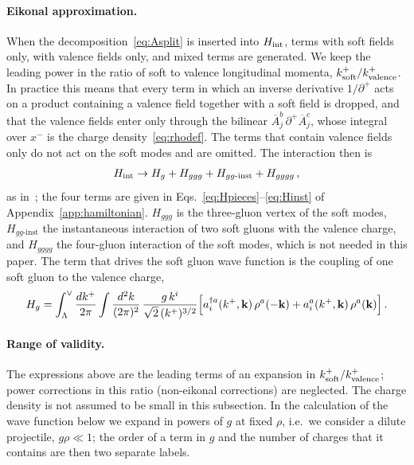 \paragraph{Eikonal approximation.} When the decomposition~\eqref{eq:Asplit} is inserted into $H_{\rm int}$, terms with soft fields only, with valence fields only, and mixed terms are generated. We keep the leading power in the ratio of soft to valence longitudinal momenta, $k^+_{\rm soft}/k^+_{\rm valence}$. In practice this means that every term in which an inverse derivative $1/\partial^+$ acts on a product containing a valence field together with a soft field is dropped, and that the valence fields enter only through the bilinear $\overline A^b_j\,\partial^+\overline A^c_j$, whose integral over $x^-$ is the charge density~\eqref{eq:rhodef}. The terms that contain valence fields only do not act on the soft modes and are omitted. The interaction then is
\begin{align}\label{eq:Hdecomp}
H_{\rm int}\to H_g+H_{ggg}+H_{gg\text{-inst}}+H_{gggg}\,,
\end{align}
as in~\cite{Lublinsky:2016meo}; the four terms are given in Eqs.~\eqref{eq:Hpieces}--\eqref{eq:Hinst} of Appendix~\ref{app:hamiltonian}. $H_{ggg}$ is the three-gluon vertex of the soft modes, $H_{gg\text{-inst}}$ the instantaneous interaction of two soft gluons with the valence charge, and $H_{gggg}$ the four-gluon interaction of the soft modes, which is not needed in this paper. The term that drives the soft gluon wave function is the coupling of one soft gluon to the valence charge,
\begin{align}\label{eq:Hg}
H_g=\int_\Lambda^\vee\frac{dk^+}{2\pi}\int\frac{d^2k}{(2\pi)^2}\,\frac{g\,k^i}{\sqrt2\,(k^+)^{3/2}}\Big[a^{\dagger a}_i(k^+,\mathbf{k})\,\rho^a(-\mathbf{k})+a^a_i(k^+,\mathbf{k})\,\rho^a(\mathbf{k})\Big]\,.
\end{align}

\paragraph{Range of validity.} The expressions above are the leading terms of an expansion in $k^+_{\rm soft}/k^+_{\rm valence}$; power corrections in this ratio (non-eikonal corrections) are neglected. The charge density is not assumed to be small in this subsection. In the calculation of the wave function below we expand in powers of $g$ at fixed $\rho$, i.e.\ we consider a dilute projectile, $g\rho\ll1$; the order of a term in $g$ and the number of charges that it contains are then two separate labels.

